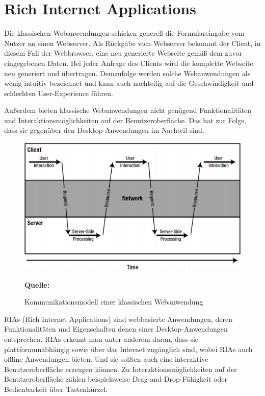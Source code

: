 \newpage
\section{Rich Internet Applications}
\label{sec:rich internet applications}
Die klassischen Webanwendungen schicken generell die Formulareingabe vom Nutzer an einen Webserver. Als Rückgabe vom Webserver bekommt der Client, in diesem Fall der Webbrowser, eine neu generierte Webseite gemäß dem zuvor eingegebenen Daten. Bei jeder Anfrage des Clients wird die komplette Webseite neu generiert und übertragen. Demzufolge werden solche Webanwendungen als wenig intuitiv bezeichnet und kann auch nachteilig auf die Geschwindigkeit und schlechten User-Experience führen.\bigskip

Außerdem bieten klassische Webanwendungen nicht genügend Funktionalitäten und Interaktionsmöglichkeiten auf der Benutzeroberfläche. Das hat zur Folge, dass sie gegenüber den Desktop-Anwendungen im Nachteil sind.

\begin{figure}[H]
  \begin{center}
    \includegraphics[scale=0.6]{img/clientServerKommunikation}
	\caption{Kommunikationsmodell einer klassischen Webanwendung}
	\footnotesize\sffamily\textbf{Quelle:} \cite{Ban2008a}  
	\label{fig:lientServerKommunikation}
  \end{center}   
\end{figure}

RIAs (Rich Internet Applications) sind webbasierte Anwendungen, deren Funktionalitäten und Eigenschaften denen einer Desktop-Anwendungen entsprechen. RIAs erkennt man unter anderem daran, dass sie plattformunabhängig sowie über das Internet zugänglich sind, wobei RIAs auch offline Anwendungen bieten. Und sie sollten auch eine interaktive Benutzeroberfläche erzeugen können. Zu Interaktionsmöglichkeiten auf der Benutzeroberfläche zählen beispielsweise Drag-and-Drop-Fähigkeit oder Bedienbarkeit über Tastenkürzel.\bigskip

